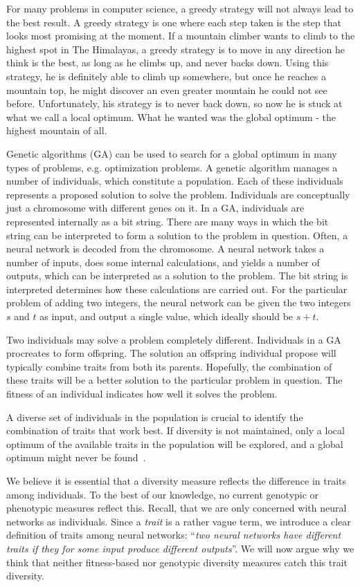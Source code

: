 For many problems in computer science, a greedy strategy will not always lead to the best result.
A greedy strategy is one where each step taken is the step that looks most promising at the moment.
If a mountain climber wants to climb to the highest spot in The Himalayas, a greedy strategy is to move in any direction he think is the best, as long as he climbs up, and never backs down.
Using this strategy, he is definitely able to climb up somewhere, but once he reaches a mountain top, he might discover an even greater mountain he could not see before. Unfortunately, his strategy is to never back down, so now he is stuck at what we call a local optimum. What he wanted was the global optimum - the highest mountain of all.
 
Genetic algorithms (GA) can be used to search for a global optimum in many types of problems, e.g. optimization problems.
A genetic algorithm manages a number of individuals, which constitute a population.
Each of these individuals represents a proposed solution to solve the problem.
Individuals are conceptually just a chromosome with different genes on it.
In a GA, individuals are represented internally as a bit string.
There are many ways in which the bit string can be interpreted to form a solution to the problem in question.
Often, a neural network is decoded from the chromosome. A neural network takes a number of inputs, does some internal calculations, and yields a number of outputs, which can be interpreted as a solution to the problem.
The bit string is interpreted determines how these calculations are carried out.
For the particular problem of adding two integers, the neural network can be given the two integers $s$ and $t$ as input, and output a single value, which ideally should be $s+t$.

Two individuals may solve a problem completely different. 
Individuals in a GA procreates to form offspring.
The solution an offspring individual propose will typically combine traits from both its parents.
Hopefully, the combination of these traits will be a better solution to the particular problem in question.
The fitness of an individual indicates how well it solves the problem.

A diverse set of individuals in the population is crucial to identify the combination of traits that work best. 
If diversity is not maintained, only a local optimum of the available traits in the population will be explored, and a global optimum might never be found~\cite{ursem2002diversity}.

We believe it is essential that a diversity measure reflects the difference in traits among individuals. To the best of our knowledge, no current genotypic or phenotypic measures reflect this. Recall, that we are only concerned with neural networks as individuals. Since a \emph{trait} is a rather vague term, we introduce a clear definition of traits among neural networks: ``\emph{two neural networks have different traits if they for some input produce different outputs}''.
We will now argue why we think that neither fitness-based nor genotypic diversity measures catch this trait diversity. 

